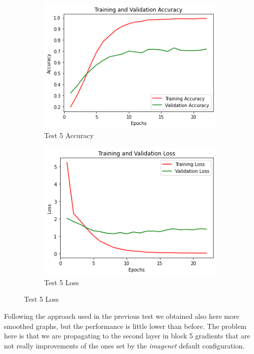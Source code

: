 \begin{figure}[H]
	\begin{subfigure}{0.5\textwidth}
		\includegraphics[width=0.9\linewidth]{img/vgg16/vgg16ft2dropacc.png} 
		\caption{Test 5 Accuracy}
		\label{fig:vgg16ft2dropacc}
	\end{subfigure}
	\begin{subfigure}{0.5\textwidth}
		\includegraphics[width=0.9\linewidth]{img/vgg16/vgg16ft2droploss.png}
		\caption{Test 5 Loss}
		\label{fig:vgg16ft2droploss}
	\end{subfigure}
\end{figure}


Following the approach used in the previous test we obtained also here more smoothed graphs, but the performance is little lower than before. The problem here is that we are propagating to the second layer in block 5 gradients that are not really improvements of the ones set by the \textit{imagenet} default configuration.






